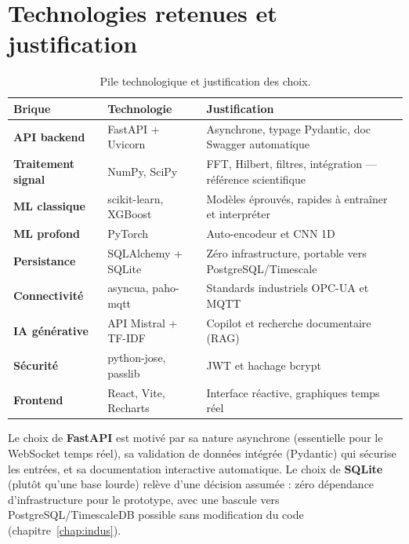 \section{Technologies retenues et justification}
\begin{table}[h]
\centering\small
\caption{Pile technologique et justification des choix.}
\label{tab:stack}
\begin{tabular}{>{\bfseries}p{3.0cm} p{6.0cm} p{4.6cm}}
\toprule
Brique & Technologie & Justification \\
\midrule
API backend & FastAPI + Uvicorn & Asynchrone, typage Pydantic, doc Swagger automatique \\
Traitement signal & NumPy, SciPy & FFT, Hilbert, filtres, intégration --- référence scientifique \\
ML classique & scikit-learn, XGBoost & Modèles éprouvés, rapides à entraîner et interpréter \\
ML profond & PyTorch & Auto-encodeur et CNN 1D \\
Persistance & SQLAlchemy + SQLite & Zéro infrastructure, portable vers PostgreSQL/Timescale \\
Connectivité & asyncua, paho-mqtt & Standards industriels OPC-UA et MQTT \\
IA générative & API Mistral + TF-IDF & Copilot et recherche documentaire (RAG) \\
Sécurité & python-jose, passlib & JWT et hachage bcrypt \\
Frontend & React, Vite, Recharts & Interface réactive, graphiques temps réel \\
\bottomrule
\end{tabular}
\end{table}

Le choix de \textbf{FastAPI} est motivé par sa nature asynchrone (essentielle pour le
WebSocket temps réel), sa validation de données intégrée (Pydantic) qui sécurise les
entrées, et sa documentation interactive automatique. Le choix de \textbf{SQLite} (plutôt
qu'une base lourde) relève d'une décision assumée : zéro dépendance d'infrastructure pour le
prototype, avec une bascule vers PostgreSQL/TimescaleDB possible sans modification du code
(chapitre~\ref{chap:indus}).
